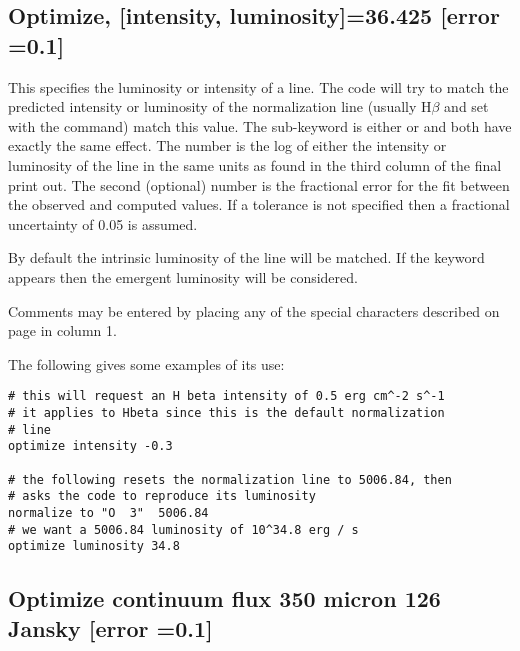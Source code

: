 \subsection{Optimize, [intensity, luminosity]=36.425 [error =0.1]}

This specifies the luminosity or intensity of a line.
The code will
try to match the predicted intensity or luminosity of the
normalization line
(usually H$\beta$ and set with the  command)
match this value.
The
sub-keyword is either  or 
and both have exactly the
same effect.
The number is the log of either the intensity or luminosity
of the line in the same units as found in the third column of
the final print out.
The second (optional) number is the fractional error for the
fit between the observed and computed values.
If a tolerance is not
specified then a fractional uncertainty of 0.05 is assumed.

By default the intrinsic luminosity of the line will be matched.
If the keyword  appears then the
emergent luminosity will be considered.

Comments may be entered by placing any of the special characters
described on page \pageref{sec:CommentsInInput} in column 1.

The following gives some examples of its use:
\begin{verbatim}
# this will request an H beta intensity of 0.5 erg cm^-2 s^-1
# it applies to Hbeta since this is the default normalization
# line
optimize intensity -0.3

# the following resets the normalization line to 5006.84, then
# asks the code to reproduce its luminosity
normalize to "O  3"  5006.84
# we want a 5006.84 luminosity of 10^34.8 erg / s
optimize luminosity 34.8
\end{verbatim}

\subsection{Optimize continuum flux 350 micron 126 Jansky [error =0.1]}
\label{sec:opt:cont:flux}

